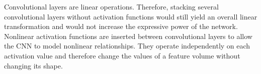\highspace
\begin{takeawaysbox}
    Convolutional layers are linear operations. Therefore, stacking several convolutional layers without activation functions would still yield an overall linear transformation and would not increase the expressive power of the network. Nonlinear activation functions are inserted between convolutional layers to allow the CNN to model nonlinear relationships. They operate independently on each activation value and therefore change the values of a feature volume without changing its shape.
\end{takeawaysbox}
